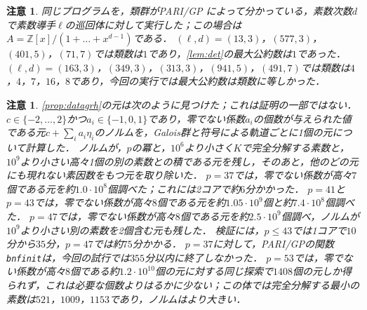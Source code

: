 \documentclass[11pt,a4paper]{ltjsarticle}
\theoremstyle{ja}
\newtheorem{remark}[theorem]{注意}
\begin{document}
\begin{remark} \label{rem:control}
同じプログラムを，類群がPARI/GP \cite{PARI}によって分かっている，素数次数$d$で素数導手$\ell$の巡回体に対して実行した；この場合は$A = \mathbb{Z}[x]/(1 + \dots + x^{d-1})$である．
$(\ell, d) = (13, 3)$，$(577, 3)$，$(401, 5)$，$(71, 7)$では類数は$1$であり，\cref{lem:det}の最大公約数は$1$であった．
$(\ell, d) = (163, 3)$，$(349, 3)$，$(313, 3)$，$(941, 5)$，$(491, 7)$では類数は$4$，$4$，$7$，$16$，$8$であり，今回の実行では最大公約数は類数に等しかった．
\end{remark}

\begin{remark} \label{rem:searchgrh}
\cref{prop:datagrh}の元は次のように見つけた；これは証明の一部ではない．
$c \in \{-2, \dots, 2\}$かつ$a_i \in \{-1, 0, 1\}$であり，零でない係数$a_i$の個数が与えられた値である元$c + \sum_i a_i \eta_i$のノルムを，Galois群と符号による軌道ごとに1個の元について計算した．
ノルムが，$p$の冪と，$10^6$より小さく$K$で完全分解する素数と，$10^9$より小さい高々1個の別の素数との積である元を残し，そのあと，他のどの元にも現れない素因数をもつ元を取り除いた．
$p = 37$では，零でない係数が高々$7$個である元を約$1.0 \cdot 10^8$個調べた；これには2コアで約$6$分かかった．
$p = 41$と$p = 43$では，零でない係数が高々$8$個である元を約$1.05 \cdot 10^9$個と約$7.4 \cdot 10^8$個調べた．
$p = 47$では，零でない係数が高々$8$個である元を約$2.5 \cdot 10^9$個調べ，ノルムが$10^9$より小さい別の素数を2個含む元も残した．
検証には，$p \le 43$では1コアで$10$分から$35$分，$p = 47$では約$75$分かかる．
$p = 37$に対して，PARI/GPの関数\texttt{bnfinit}は，今回の試行では$355$分以内に終了しなかった．
$p = 53$では，零でない係数が高々$8$個である約$1.2 \cdot 10^{10}$個の元に対する同じ探索で$1408$個の元しか得られず，これは必要な個数よりはるかに少ない；この体では完全分解する最小の素数は$521$，$1009$，$1153$であり，ノルムはより大きい．
\end{remark}
\end{document}

